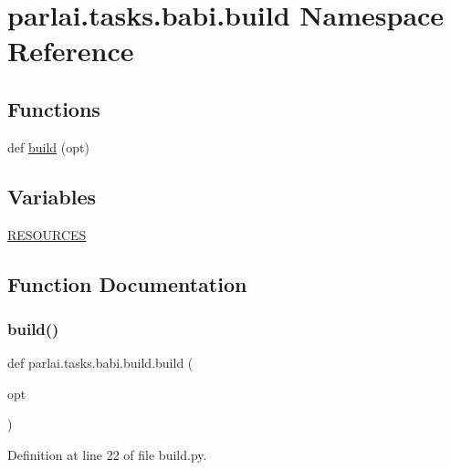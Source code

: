 \hypertarget{namespaceparlai_1_1tasks_1_1babi_1_1build}{}\section{parlai.\+tasks.\+babi.\+build Namespace Reference}
\label{namespaceparlai_1_1tasks_1_1babi_1_1build}
\subsection*{Functions}
\begin{DoxyCompactItemize}
\item 
def \hyperlink{namespaceparlai_1_1tasks_1_1babi_1_1build_a24b76b74415839eb5c7fa1233fbface4}{build} (opt)
\end{DoxyCompactItemize}
\subsection*{Variables}
\begin{DoxyCompactItemize}
\item 
\hyperlink{namespaceparlai_1_1tasks_1_1babi_1_1build_abde09c52639937c04179eb0a31c5618f}{R\+E\+S\+O\+U\+R\+C\+ES}
\end{DoxyCompactItemize}


\subsection{Function Documentation}
\mbox{\label{namespaceparlai_1_1tasks_1_1babi_1_1build_a24b76b74415839eb5c7fa1233fbface4}} 
\subsubsection{\texorpdfstring{build()}{build()}}
{\footnotesize\ttfamily def parlai.\+tasks.\+babi.\+build.\+build (\begin{DoxyParamCaption}\item[{}]{opt }\end{DoxyParamCaption})}



Definition at line 22 of file build.\+py.



